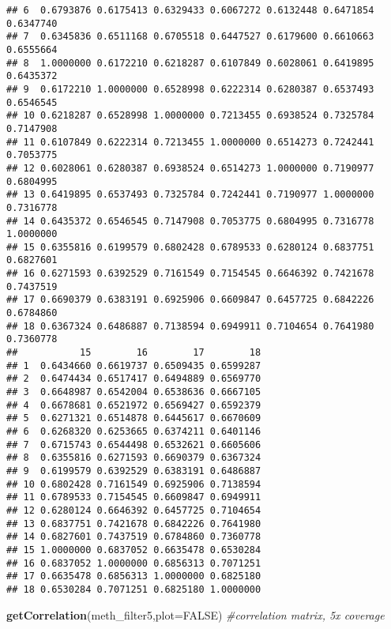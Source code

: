\documentclass[]{article}
\newenvironment{Shaded}{\begin{snugshade}}{\end{snugshade}}
\newcommand{\KeywordTok}[1]{\textcolor[rgb]{0.13,0.29,0.53}{\textbf{#1}}}
\newcommand{\DataTypeTok}[1]{\textcolor[rgb]{0.13,0.29,0.53}{#1}}
\newcommand{\CommentTok}[1]{\textcolor[rgb]{0.56,0.35,0.01}{\textit{#1}}}
\newcommand{\OtherTok}[1]{\textcolor[rgb]{0.56,0.35,0.01}{#1}}
\newcommand{\NormalTok}[1]{#1}
\begin{document}
\begin{verbatim}
## 6  0.6793876 0.6175413 0.6329433 0.6067272 0.6132448 0.6471854 0.6347740
## 7  0.6345836 0.6511168 0.6705518 0.6447527 0.6179600 0.6610663 0.6555664
## 8  1.0000000 0.6172210 0.6218287 0.6107849 0.6028061 0.6419895 0.6435372
## 9  0.6172210 1.0000000 0.6528998 0.6222314 0.6280387 0.6537493 0.6546545
## 10 0.6218287 0.6528998 1.0000000 0.7213455 0.6938524 0.7325784 0.7147908
## 11 0.6107849 0.6222314 0.7213455 1.0000000 0.6514273 0.7242441 0.7053775
## 12 0.6028061 0.6280387 0.6938524 0.6514273 1.0000000 0.7190977 0.6804995
## 13 0.6419895 0.6537493 0.7325784 0.7242441 0.7190977 1.0000000 0.7316778
## 14 0.6435372 0.6546545 0.7147908 0.7053775 0.6804995 0.7316778 1.0000000
## 15 0.6355816 0.6199579 0.6802428 0.6789533 0.6280124 0.6837751 0.6827601
## 16 0.6271593 0.6392529 0.7161549 0.7154545 0.6646392 0.7421678 0.7437519
## 17 0.6690379 0.6383191 0.6925906 0.6609847 0.6457725 0.6842226 0.6784860
## 18 0.6367324 0.6486887 0.7138594 0.6949911 0.7104654 0.7641980 0.7360778
##           15        16        17        18
## 1  0.6434660 0.6619737 0.6509435 0.6599287
## 2  0.6474434 0.6517417 0.6494889 0.6569770
## 3  0.6648987 0.6542004 0.6538636 0.6667105
## 4  0.6678681 0.6521972 0.6569427 0.6592379
## 5  0.6271321 0.6514878 0.6445617 0.6670609
## 6  0.6268320 0.6253665 0.6374211 0.6401146
## 7  0.6715743 0.6544498 0.6532621 0.6605606
## 8  0.6355816 0.6271593 0.6690379 0.6367324
## 9  0.6199579 0.6392529 0.6383191 0.6486887
## 10 0.6802428 0.7161549 0.6925906 0.7138594
## 11 0.6789533 0.7154545 0.6609847 0.6949911
## 12 0.6280124 0.6646392 0.6457725 0.7104654
## 13 0.6837751 0.7421678 0.6842226 0.7641980
## 14 0.6827601 0.7437519 0.6784860 0.7360778
## 15 1.0000000 0.6837052 0.6635478 0.6530284
## 16 0.6837052 1.0000000 0.6856313 0.7071251
## 17 0.6635478 0.6856313 1.0000000 0.6825180
## 18 0.6530284 0.7071251 0.6825180 1.0000000
\end{verbatim}

\begin{Shaded}
\begin{Highlighting}[]
\KeywordTok{getCorrelation}\NormalTok{(meth_filter5,}\DataTypeTok{plot=}\OtherTok{FALSE}\NormalTok{)  }\CommentTok{#correlation matrix, 5x coverage}
\end{Highlighting}
\end{Shaded}
\end{document}

